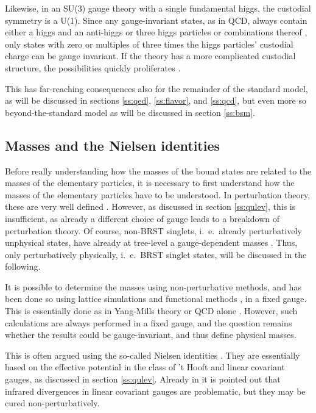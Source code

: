 \documentclass[final,12pt,3p,longtitle]{elsarticle}
\newcommand*{\1}{1\!\!\!\bot}
\begin{document}
Likewise, in an SU(3) gauge theory with a single fundamental higgs, the custodial symmetry is a U(1). Since any gauge-invariant states, as in QCD, always contain either a higgs and an anti-higgs or three higgs particles or combinations thereof \cite{Iida:2007qp,Maas:2016ngo,Maas:2017xzh}, only states with zero or multiples of three times the higgs particles' custodial charge can be gauge invariant. If the theory has a more complicated custodial structure, the possibilities quickly proliferates \cite{Wurtz:2009gf,Lewis:2010ps,Maas:2016qpu,Maas:2017xzh}.

This has far-reaching consequences also for the remainder of the standard model, as will be discussed in sections \ref{ss:qed}, \ref{ss:flavor}, and \ref{ss:qcd}, but even more so beyond-the-standard model as will be discussed in section \ref{ss:bsm}.

\subsection{Masses and the Nielsen identities}\label{ss:masses}

Before really understanding how the masses of the bound states are related to the masses of the elementary particles, it is necessary to first understand how the masses of the elementary particles have to be understood. In perturbation theory, these are very well defined \cite{Bohm:2001yx}. However, as discussed in section \ref{ss:qulev}, this is insufficient, as already a different choice of gauge leads to a breakdown of perturbation theory. Of course, non-BRST singlets, i.\ e.\ already perturbatively unphysical states, have already at tree-level a gauge-dependent masses \cite{Bohm:2001yx}. Thus, only perturbatively physically, i.\ e.\ BRST singlet states, will be discussed in the following.

It is possible to determine the masses using non-perturbative methods, and has been done so using lattice simulations \cite{Maas:2010nc,Maas:2012tj,Maas:2013aia,Maas:2016edk,Maas:2016ngo} and functional methods \cite{Benes:2008ir,Fister:2010yw}, in a fixed gauge. This is essentially done as in Yang-Mills theory or QCD alone \cite{Maas:2011se}. However, such calculations are always performed in a fixed gauge, and the question remains whether the results could be gauge-invariant, and thus define physical masses.

This is often argued using the so-called Nielsen identities \cite{Nielsen:1975fs}. They are essentially based on the effective potential in the class of 't Hooft and linear covariant gauges, as discussed in section \ref{ss:qulev}. Already in \cite{Nielsen:1975fs} it is pointed out that infrared divergences in linear covariant gauges are problematic, but they may be cured non-perturbatively.
\end{document}
